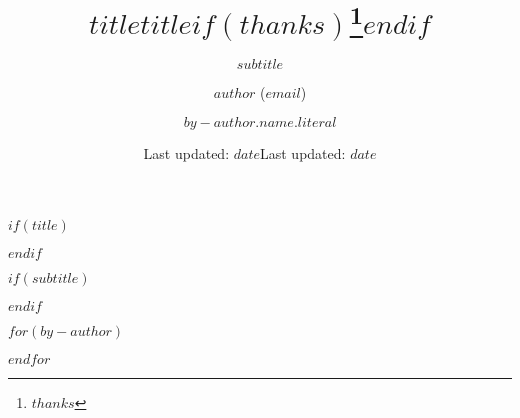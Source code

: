 \title{$title$}
\author{\normalsize $author$ ($email$)}
\date{\normalsize Last updated: $date$}

$if(title)$
\title{$title$$if(thanks)$\thanks{$thanks$}$endif$}
$endif$

$if(subtitle)$
\subtitle{$subtitle$}
$endif$

$for(by-author)$
  \author{\normalsize $by-author.name.literal$}
$endfor$

\date{\normalsize Last updated: $date$}